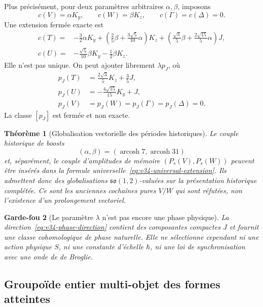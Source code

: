 \documentclass[11pt,a4paper]{article}
\newtheorem{theorem}{Théorème}[section]
\newtheorem{guardrail}[theorem]{Garde-fou}
\begin{document}
Plus précisément, pour deux paramètres arbitraires $\alpha,\beta$, imposons
\[
 c(V)=\alpha K_y,
 \qquad
 c(W)=\beta K_z,
 \qquad
 c(\Gamma)=c(\Delta)=0.
\]
Une extension fermée exacte est
\begin{equation}\label{eq:v34-universal-extension}
\boxed{\begin{aligned}
 c(T)={}&-\frac32\alpha K_y
 +\left(\frac25\beta+\frac{3\sqrt5}{10}\alpha\right)K_z
 +\left(\frac{\sqrt3}{5}\beta+\frac{2\sqrt{15}}5\alpha\right)J,\\
 c(U)={}&-\frac{\sqrt5}{10}\beta K_y-\frac12\beta K_z.
\end{aligned}}
\end{equation}
Elle n'est pas unique. On peut ajouter librement $\lambda p_J$, où
\begin{equation}\label{eq:v34-phase-direction}
\boxed{\begin{aligned}
 p_J(T)&=\frac{2\sqrt3}{5}K_z+\frac35J,\\
 p_J(U)&=-\frac{4\sqrt{15}}{15}K_y+J,\\
 p_J(V)&=p_J(W)=p_J(\Gamma)=p_J(\Delta)=0.
\end{aligned}}
\end{equation}
La classe $[p_J]$ est fermée et non exacte.

\begin{theorem}[Globalisation vectorielle des périodes historiques]\label{thm:v34-vector-globalization}
Le couple historique de boosts
\[
 (\alpha,\beta)=(\operatorname{arcosh}7,\operatorname{arcosh}31)
\]
et, séparément, le couple d'amplitudes de mémoire $(P_s(V),P_s(W))$ peuvent être insérés dans
la formule universelle~\eqref{eq:v34-universal-extension}. Ils admettent donc des globalisations
$\mathfrak{so}(1,2)$-valuées sur la présentation historique complétée. Ce sont les anciennes
cochaînes pures $V/W$ qui sont réfutées, non l'existence d'un prolongement vectoriel.
\end{theorem}

\begin{guardrail}[Le paramètre $\lambda$ n'est pas encore une phase physique]
La direction~\eqref{eq:v34-phase-direction} contient des composantes compactes $J$ et fournit une
classe cohomologique de phase naturelle. Elle ne sélectionne cependant ni une action physique
$S$, ni une constante d'échelle $\hbar$, ni une loi de synchronisation avec une onde de de Broglie.
\end{guardrail}

\subsection{Groupoïde entier multi-objet des formes atteintes}
\end{document}

